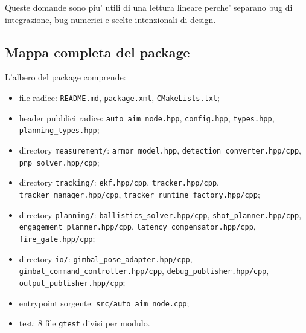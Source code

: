 \documentclass[11pt,a4paper]{article}
\newcommand{\code}[1]{\texttt{#1}}
\begin{document}
Queste domande sono piu' utili di una lettura lineare perche' separano bug di integrazione, bug numerici e scelte intenzionali di design.

\subsection{Mappa completa del package}

L'albero del package comprende:
\begin{itemize}[leftmargin=1.4em]
  \item file radice: \code{README.md}, \code{package.xml}, \code{CMakeLists.txt};
  \item header pubblici radice: \code{auto\_aim\_node.hpp}, \code{config.hpp}, \code{types.hpp}, \code{planning\_types.hpp};
  \item directory \code{measurement/}: \code{armor\_model.hpp}, \code{detection\_converter.hpp/cpp}, \code{pnp\_solver.hpp/cpp};
  \item directory \code{tracking/}: \code{ekf.hpp/cpp}, \code{tracker.hpp/cpp}, \code{tracker\_manager.hpp/cpp}, \code{tracker\_runtime\_factory.hpp/cpp};
  \item directory \code{planning/}: \code{ballistics\_solver.hpp/cpp}, \code{shot\_planner.hpp/cpp}, \code{engagement\_planner.hpp/cpp}, \code{latency\_compensator.hpp/cpp}, \code{fire\_gate.hpp/cpp};
  \item directory \code{io/}: \code{gimbal\_pose\_adapter.hpp/cpp}, \code{gimbal\_command\_controller.hpp/cpp}, \code{debug\_publisher.hpp/cpp}, \code{output\_publisher.hpp/cpp};
  \item entrypoint sorgente: \code{src/auto\_aim\_node.cpp};
  \item test: 8 file \code{gtest} divisi per modulo.
\end{itemize}
\end{document}
